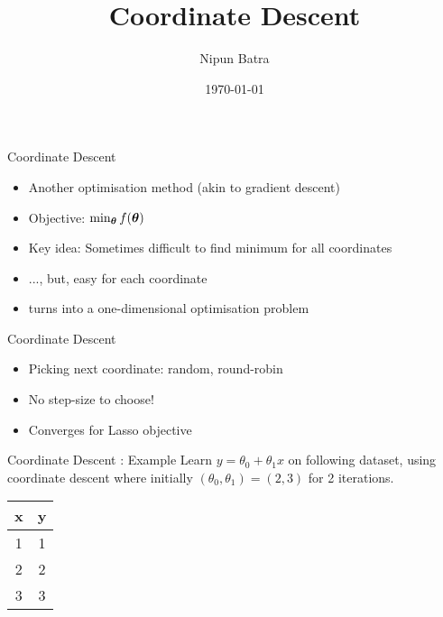 \documentclass{beamer}
\title{Coordinate Descent}
\date{\today}
\author{Nipun Batra}
\institute{IIT Gandhinagar}
\begin{document}
\maketitle


\begin{frame}{Coordinate Descent}
\begin{itemize}[<+->]
	\item Another optimisation method (akin to gradient descent)
	\item Objective: $\min_{\boldsymbol{\theta}} f(\boldsymbol{\theta})$
	\item Key idea: Sometimes difficult to find minimum for all coordinates
	\item ..., but, easy for each coordinate
	\item turns into a one-dimensional optimisation problem
\end{itemize}
\end{frame}

% 	


\begin{frame}{Coordinate Descent}
\begin{itemize}[<+->]
	\item Picking next coordinate: \pause random, round-robin
	\item No step-size to choose!
	\item Converges for Lasso objective
\end{itemize}
\end{frame}




	\begin{frame}{Coordinate Descent : Example}
Learn $y = \theta_0 + \theta_1 x$ on following dataset, using coordinate descent where initially $(\theta_0, \theta_1) = (2,3)$ for 2 iterations. 
\begin{table}[]
	\centering
	\label{tab:my-table}
	\begin{tabular}{|c|c|}
		\hline
		\textbf{x} & \textbf{y} \\ \hline
		1 & 1 \\ \hline
		2 & 2 \\ \hline
		3 & 3 \\ \hline
	\end{tabular}
\end{table}
\end{frame}
\end{document}
